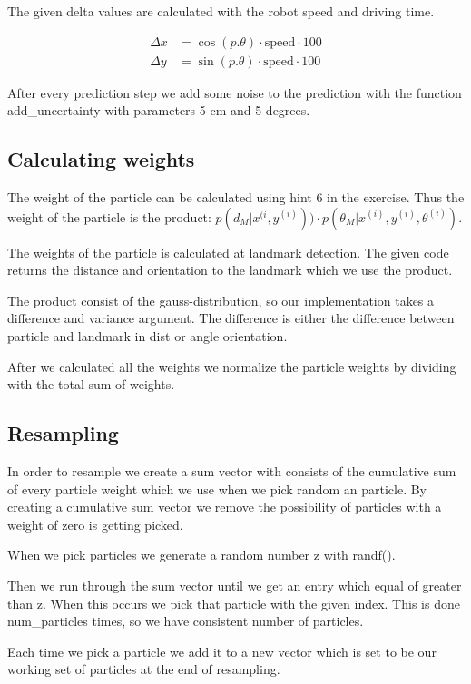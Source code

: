 \documentclass[a4paper,12pt]{article}
\begin{document}
The given delta values are calculated with the robot speed and driving time. 

\begin{align*}
\Delta x &= \cos(p.\theta)\cdot\text{speed}\cdot 100\\
\Delta y &= \sin(p.\theta)\cdot\text{speed}\cdot 100
\end{align*}

After every prediction step we add some noise to the prediction with the
function add_uncertainty with parameters 5 cm and 5 degrees.

\subsection{Calculating weights}

The weight of the particle can be calculated using hint 6 in the exercise. Thus
the weight of the particle is the product: $p(d_M | x^{(i}, y^{(i)})) \cdot
p(\theta_M |x^{(i)} , y^{(i)} , \theta^{(i)} ) $.

The weights of the particle is calculated at landmark detection. The given code
returns the distance and orientation to the landmark which we use the product.

The product consist of the gauss-distribution, so our implementation takes a
difference and variance argument. The difference is either the difference
between particle and landmark in dist or angle orientation.

After we calculated all the weights we normalize the particle weights by
dividing with the total sum of weights.

\subsection{Resampling}

In order to resample we create a sum vector with consists of the cumulative sum
of every particle weight which we use when we pick random an particle. By
creating a cumulative sum vector we remove the possibility of particles with a
weight of zero is getting picked.

When we pick particles we generate a random number z with randf().

Then we run through the sum vector until we get an entry which equal of greater
than z. When this occurs we pick that particle with the given index. This is
done num_particles times, so we have consistent number of particles.

Each time we pick a particle we add it to a new vector which is set to be our
working set of particles at the end of resampling.
\end{document}

